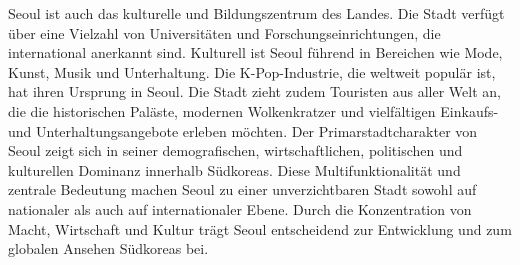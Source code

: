 \documentclass[12pt,a4paper]{report}
\begin{document}
	Seoul ist auch das kulturelle und Bildungszentrum des Landes.
	Die Stadt verfügt über eine Vielzahl von Universitäten und Forschungseinrichtungen, die international anerkannt sind.
	Kulturell ist Seoul führend in Bereichen wie Mode, Kunst, Musik und Unterhaltung.
	Die K-Pop-Industrie, die weltweit populär ist, hat ihren Ursprung in Seoul. Die Stadt zieht zudem Touristen aus aller Welt an, die die historischen Paläste, modernen Wolkenkratzer und vielfältigen Einkaufs- und Unterhaltungsangebote erleben möchten.
	Der Primarstadtcharakter von Seoul zeigt sich in seiner demografischen, wirtschaftlichen, politischen und kulturellen Dominanz innerhalb Südkoreas.
	Diese Multifunktionalität und zentrale Bedeutung machen Seoul zu einer unverzichtbaren Stadt sowohl auf nationaler als auch auf internationaler Ebene.
	Durch die Konzentration von Macht, Wirtschaft und Kultur trägt Seoul entscheidend zur Entwicklung und zum globalen Ansehen Südkoreas bei.
	
\end{document}
